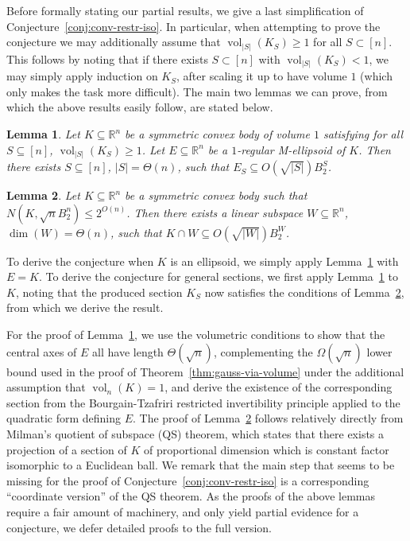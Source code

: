 \documentclass[11pt]{article}
\newtheorem{lemma}{Lemma}
\newcommand{\R}{{\mathbb{R}}}
\DeclareMathOperator{\vol}{vol}
\begin{document}
Before formally stating our partial results, we give a last simplification of
Conjecture~\ref{conj:conv-restr-iso}. In particular, when attempting to prove
the conjecture we may additionally assume that $\vol_{|S|}(K_S) \geq 1$ for all
$S \subset [n]$. This follows by noting that if there exists $S \subset [n]$
with $\vol_{|S|}(K_S) < 1$, we may simply apply induction on $K_S$, after
scaling it up to have volume $1$ (which only makes the task more difficult). The
main two lemmas we can prove, from which the above results easily follow,
are stated below. 

\begin{lemma}
\label{lem:axis-m-ell}
Let $K \subseteq \R^n$ be a symmetric convex body of volume $1$ satisfying
for all $S \subseteq [n]$, $\vol_{|S|}(K_S) \geq 1$. Let $E \subseteq \R^n$ be a
$1$-regular M-ellipsoid of $K$. Then there exists $S \subseteq [n]$, $|S| =
\Theta(n)$, such that $E_S \subseteq O(\sqrt{|S|}) B_2^S$.
\end{lemma}

\begin{lemma}
\label{lem:cover-to-section}
Let $K \subseteq \R^n$ be a symmetric convex body such that $N(K,\sqrt{n}B_2^n)
\leq 2^{O(n)}$. Then there exists a linear subspace $W \subseteq \R^n$, $\dim(W) =
\Theta(n)$, such that $K \cap W \subseteq O(\sqrt{|W|}) B_2^W$.  
\end{lemma}

To derive the conjecture when $K$ is an ellipsoid, we simply apply
Lemma~\ref{lem:axis-m-ell} with $E=K$. To derive the conjecture for general
sections, we first apply Lemma~\ref{lem:axis-m-ell} to $K$, noting that the
produced section $K_S$ now satisfies the conditions of
Lemma~\ref{lem:cover-to-section}, from which we derive the result.  

For the proof of Lemma~\ref{lem:axis-m-ell}, we use the volumetric conditions to
show that the central axes of $E$ all have length $\Theta(\sqrt{n})$,
complementing the $\Omega(\sqrt{n})$ lower bound used in the proof of
Theorem~\ref{thm:gauss-via-volume} under the additional assumption that
$\vol_n(K)=1$, and derive the existence of the
corresponding section from the Bourgain-Tzafriri restricted invertibility principle
applied to the quadratic form defining $E$. The proof of
Lemma~\ref{lem:cover-to-section} follows relatively directly from Milman's
quotient of subspace (QS) theorem, which states that there exists a projection
of a section of $K$ of proportional dimension which is constant factor
isomorphic to a Euclidean ball. We remark that the main step that seems to be
missing for the proof of Conjecture~\ref{conj:conv-restr-iso} is a
corresponding ``coordinate version'' of the QS theorem. As the proofs of the
above lemmas require a fair amount of machinery, and only yield partial evidence
for a conjecture, we defer detailed proofs to the full version.  
\end{document}
